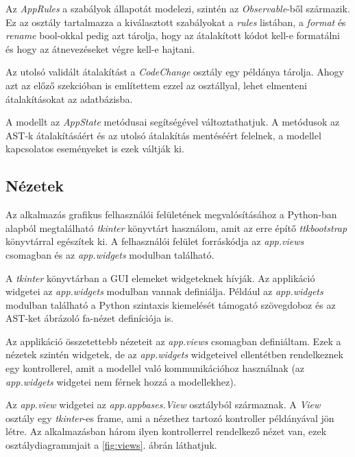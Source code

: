 Az \emph{AppRules} a szabályok állapotát modelezi, szintén az \emph{Observable}-ből
származik.
Ez az osztály tartalmazza a kiválasztott szabályokat a \emph{rules} listában,
a \emph{format} és \emph{rename} bool-okkal pedig azt tárolja, hogy az átalakított
kódot kell-e formatálni és hogy az átnevezéseket végre kell-e hajtani.

\pagebreak

Az utolsó validált átalakítást a \emph{CodeChange} osztály egy példánya tárolja.
Ahogy azt az előző szekcióban is említettem ezzel az osztállyal,
lehet elmenteni átalakításokat az adatbázisba.

A modellt az \emph{AppState} metódusai segítségével változtathatjuk.
A metódusok az AST-k átalakításáért és az utolsó átalakítás mentéséért felelnek,
a modellel kapcsolatos eseményeket is ezek váltják ki.

\subsection{Nézetek}

Az alkalmazás grafikus felhasználói felületének megvalósításához
a Python-ban alapból megtalálható
\emph{tkinter} könyvtárt használom, amit az erre építő \emph{ttkbootstrap} könyvtárral
egészítek ki.
A felhasználói felület forráskódja az \emph{app.views} csomagban és az \emph{app.widgets}
modulban található.

A \emph{tkinter} könyvtárban a GUI elemeket widgeteknek hívják.
Az applikáció widgetei az \emph{app.widgets} modulban vannak definiálja.
Például az \emph{app.widgets} modulban található
a Python szintaxis kiemelését támogató szövegdoboz
és az AST-ket ábrázoló fa-nézet definíciója is.

Az applikáció összetettebb nézeteit az \emph{app.views} csomagban definiáltam.
Ezek a nézetek szintén widgetek,
de az \emph{app.widgets} widgeteivel ellentétben
rendelkeznek egy kontrollerel,
amit a modellel való kommunikációhoz használnak
(az \emph{app.widgets} widgetei nem férnek hozzá a modellekhez).

Az \emph{app.view} widgetei az \emph{app.appbases.View} osztályból származnak.
A \emph{View} osztály egy \emph{tkinter}-es frame, ami
a nézethez tartozó kontroller példányával jön létre.
Az alkalmazásban három ilyen kontrollerrel rendelkező nézet van,
ezek osztálydiagrammjait a \ref{fig:views}. ábrán láthatjuk.

